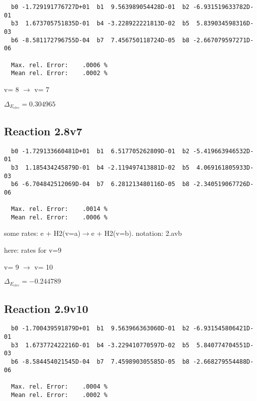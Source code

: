 \documentclass[12pt]{article}
\begin{document}
\begin{small}\begin{verbatim}
  b0 -1.729191776727D+01  b1  9.563989054428D-01  b2 -6.931519633782D-01
  b3  1.673705751835D-01  b4 -3.228922221813D-02  b5  5.839034598316D-03
  b6 -8.581172796755D-04  b7  7.456750118724D-05  b8 -2.667079597271D-06

  Max. rel. Error:    .0006 %
  Mean rel. Error:    .0002 %

\end{verbatim}\end{small}

  v=  8 $\rightarrow$ v= 7

$\Delta_{E_{elec}}= 0.304965$


\subsection{
Reaction 2.8v7
}


\begin{small}\begin{verbatim}
  b0 -1.729133660481D+01  b1  6.517705262809D-01  b2 -5.419663946532D-01
  b3  1.185434245879D-01  b4 -2.119497413881D-02  b5  4.069161805933D-03
  b6 -6.704842512069D-04  b7  6.281213480116D-05  b8 -2.340519067726D-06

  Max. rel. Error:    .0014 %
  Mean rel. Error:    .0006 %

\end{verbatim}\end{small}
\newpage
some rates: e + H2(v=a)$\rightarrow$e + H2(v=b). notation: 2.avb

here: rates for v=9


  v=  9 $\rightarrow$ v= 10

$\Delta_{E_{elec}}=-0.244789$


\subsection{
Reaction 2.9v10
}


\begin{small}\begin{verbatim}
  b0 -1.700439591879D+01  b1  9.563966363060D-01  b2 -6.931545806421D-01
  b3  1.673772422216D-01  b4 -3.229410770597D-02  b5  5.840774704551D-03
  b6 -8.584454021545D-04  b7  7.459890305585D-05  b8 -2.668279554488D-06

  Max. rel. Error:    .0004 %
  Mean rel. Error:    .0002 %

\end{verbatim}\end{small}
\end{document}
